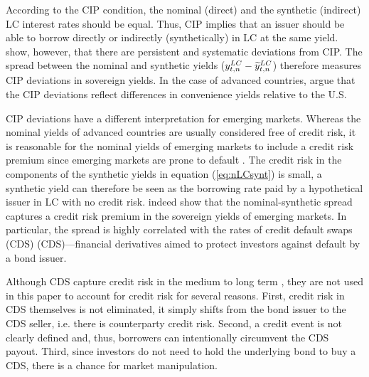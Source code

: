 {According to the CIP condition, the nominal (direct) and the synthetic (indirect) LC interest rates should be equal. 
Thus, CIP implies that an 
issuer should be able to borrow directly or indirectly (synthetically) in LC at the same yield. 
\cite*{DuTepperVerdelhan:2018} show, however, that there are persistent and systematic deviations from CIP. 
The spread between the nominal and synthetic yields (\(y_{t,n} ^{LC} - \widetilde{y}_{t,n} ^{LC}\)) therefore measures CIP deviations in sovereign yields.
In the case of advanced countries, \cite*{DuImSchreger:2018JIE} argue that the CIP deviations reflect differences in convenience yields relative to the U.S.

CIP deviations have a different interpretation for emerging markets. 
Whereas the nominal yields of advanced countries are usually considered free of credit risk, it is reasonable for the nominal yields of emerging markets to include a credit risk premium since emerging markets are prone to default  \citep{ReinhartRogoff:2011,ErceMallucci:2018}.
The credit risk in the components of the synthetic yields in equation (\ref{eq:nLCsynt}) is small, a synthetic yield can therefore be seen as the borrowing rate paid by a hypothetical issuer in LC with no credit risk. 
\cite{DuSchreger:2016JoF} indeed show that the nominal-synthetic spread captures a credit risk premium in the sovereign yields of emerging markets.
In particular, the spread is highly correlated with the rates of credit default swaps (CDS) (CDS)---financial derivatives aimed to protect investors against default by a bond issuer.

Although CDS capture credit risk in the medium to long term \citep{PalladiniPortes:2011}, they are not used in this paper to account for credit risk for several reasons. First, credit risk in CDS themselves is not eliminated, it simply shifts from the bond issuer to the CDS seller, i.e. there is counterparty credit risk. Second, a credit event is not clearly defined and, thus, borrowers can intentionally circumvent the CDS payout. Third, since investors do not need to hold the underlying bond to buy a CDS, there is a chance for market manipulation.


}
